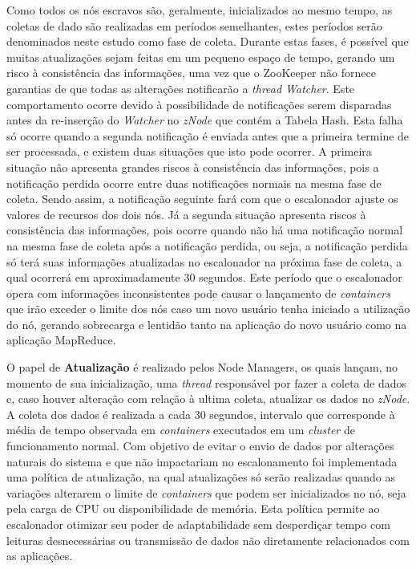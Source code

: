 Como todos os nós escravos são, geralmente, inicializados ao mesmo tempo, as coletas de dado são realizadas em períodos semelhantes, estes períodos serão denominados neste estudo como fase de coleta. Durante estas fases, é possível que muitas atualizações sejam feitas em um pequeno espaço de tempo, gerando um risco à consistência das informações, uma vez que o ZooKeeper não fornece garantias de que todas as alterações notificarão a \textit{thread Watcher}. Este comportamento ocorre devido à possibilidade de notificações serem disparadas antes da re-inserção do \textit{Watcher} no \textit{zNode} que contém a Tabela Hash. Esta falha só ocorre quando a segunda notificação é enviada antes que a primeira termine de ser processada, e existem duas situações que isto pode ocorrer. A primeira situação não apresenta grandes riscos à consistência das informações, pois a notificação perdida  ocorre entre duas notificações normais na mesma fase de coleta. Sendo assim, a notificação seguinte fará com que o escalonador ajuste os valores de recursos dos dois nós. Já a segunda situação apresenta riscos à consistência das informações, pois ocorre quando não há uma notificação normal na mesma fase de coleta após a notificação perdida, ou seja, a notificação perdida só terá suas informações atualizadas no escalonador na próxima fase de coleta, a qual ocorrerá em aproximadamente 30 segundos. Este período que o escalonador opera com informações inconsistentes pode causar o lançamento de \textit{containers} que irão exceder o limite dos nós caso um novo usuário tenha iniciado a utilização do nó, gerando sobrecarga e lentidão tanto na aplicação do novo usuário como na aplicação MapReduce.

	
O papel de \textbf{Atualização} é realizado pelos Node Managers, os quais lançam, no momento de sua inicialização, uma \textit{thread} responsável por fazer a coleta de dados e, caso houver alteração com relação à ultima coleta, atualizar os dados no \textit{zNode}. A coleta dos dados é realizada a cada 30 segundos, intervalo que corresponde à média de tempo observada em \textit{containers} executados em um \textit{cluster} de funcionamento normal. Com objetivo de evitar o envio de dados por alterações naturais do sistema e que não impactariam no escalonamento foi implementada uma política de atualização, na qual atualizações só serão realizadas quando as variações alterarem o limite de \textit{containers} que podem ser inicializados no nó, seja pela carga de CPU ou disponibilidade de memória. Esta política permite ao escalonador otimizar seu poder de adaptabilidade sem desperdiçar tempo com leituras desnecessárias ou transmissão de dados não diretamente relacionados com as aplicações.


